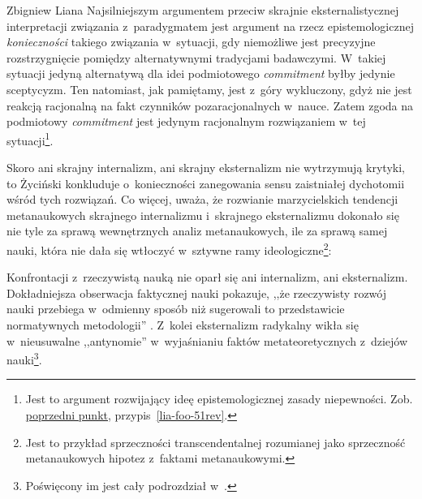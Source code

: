 \begin{artplenv}{Zbigniew Liana}
Najsilniejszym argumentem przeciw skrajnie eksternalistycznej interpretacji związania z~paradygmatem jest argument na
rzecz epistemologicznej \textit{konieczności} takiego związania w~sytuacji, gdy niemożliwe jest precyzyjne
rozstrzygnięcie pomiędzy alternatywnymi tradycjami badawczymi. W~takiej sytuacji jedyną alternatywą dla idei
podmiotowego \textit{commitment} byłby jedynie sceptycyzm. Ten natomiast, jak pamiętamy, jest z~góry wykluczony, gdyż nie
jest reakcją racjonalną na fakt czynników pozaracjonalnych w~nauce. Zatem zgoda na podmiotowy \textit{commitment} jest
jedynym racjonalnym rozwiązaniem w~tej sytuacji\footnote{Jest to argument rozwijający ideę epistemologicznej zasady
niepewności. Zob. \hyperref[lia-sec-4]{poprzedni punkt}, przypis~\ref{lia-foo-51rev}.}.

Skoro ani skrajny internalizm, ani skrajny eksternalizm nie wytrzymują krytyki, to Życiński konkluduje o~konieczności
zanegowania sensu zaistniałej dychotomii wśród tych rozwiązań. Co więcej, uważa, że rozwianie marzycielskich tendencji
metanaukowych skrajnego internalizmu i~skrajnego eksternalizmu dokonało się nie tyle za sprawą wewnętrznych analiz
metanaukowych, ile za sprawą samej nauki, która nie dała się wtłoczyć w~sztywne ramy ideologiczne\footnote{Jest to
przykład sprzeczności transcendentalnej rozumianej jako sprzeczność metanaukowych hipotez z~faktami metanaukowymi.}:


Konfrontacji z~rzeczywistą nauką nie oparł się ani internalizm, ani eksternalizm. Dokładniejsza obserwacja faktycznej
nauki pokazuje, ,,że rzeczywisty rozwój nauki przebiega w~odmienny sposób niż sugerowali to przedstawicie normatywnych
metodologii''
\parencite[s.~230]{zycinski_elementy_1996}.
Z~kolei eksternalizm radykalny wikła
się w~nieusuwalne ,,antynomie'' w~wyjaśnianiu faktów metateoretycznych z~dziejów nauki\footnote{Poświęcony im jest cały
podrozdział w~\parencite[s.~147–156]{zycinski_elementy_1996}.
}.


\end{artplenv}

